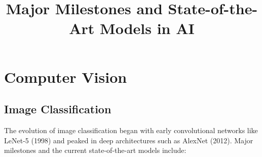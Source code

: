 \documentclass{article}
\title{\textbf{Major Milestones and State-of-the-Art Models in AI}}
\author{}
\date{}
\begin{document}
\maketitle

\section{Computer Vision}

\subsection{Image Classification}
The evolution of image classification began with early convolutional networks like LeNet-5 (1998) and peaked in deep architectures such as AlexNet (2012). Major milestones and the current state-of-the-art models include:
\end{document}
